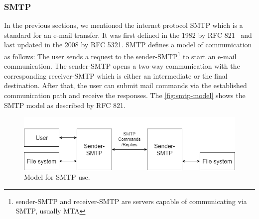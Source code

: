 \subsubsection{SMTP}
\label{smtp}
In the previous sections, we mentioned the internet protocol SMTP which is a standard for an e-mail transfer. It was first defined in the 1982 by RFC 821~\cite{rfc821} and last updated in the 2008 by RFC 5321.
SMTP defines a model of communication as follows: The user sends a request to the sender-SMTP\footnote{sender-SMTP and receiver-SMTP are servers capable of communicating via SMTP, usually MTA} to start an e-mail communication. The sender-SMTP opens a two-way communication with the corresponding receiver-SMTP which is either an intermediate or the final destination. After that, the user can submit mail commands via the established communication path and receive the responses.
The \autoref{fig:smtp-model} shows the SMTP model as described by RFC 821.
\begin{figure}
\centering
\includegraphics[width=\textwidth]{img/smtp_model.png}
\caption{Model for SMTP use.}
\label{fig:smtp-model}
\end{figure}

